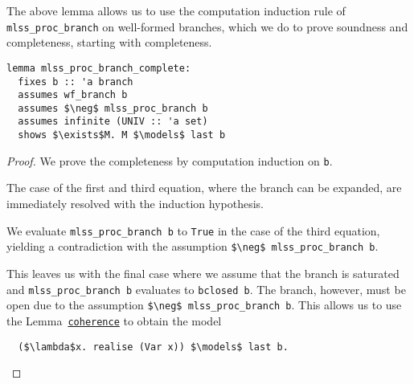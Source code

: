 \documentclass[sigplan,10pt,anonymous,review]{acmart}
\begin{document}
\noindent The above lemma allows us to use the computation induction rule of \lstinline!mlss_proc_branch! on well-formed branches, which we do to prove soundness and completeness, starting with completeness.
\begin{lstlisting}[belowskip=0pt]
lemma mlss_proc_branch_complete:
  fixes b :: 'a branch
  assumes wf_branch b
  assumes $\neg$ mlss_proc_branch b
  assumes infinite (UNIV :: 'a set)
  shows $\exists$M. M $\models$ last b
\end{lstlisting}
\begin{proof}
  We prove the completeness by computation induction on \lstinline!b!.

  The case of the first and third equation, where the branch can be expanded, are immediately resolved with the induction hypothesis.

  We evaluate \lstinline!mlss_proc_branch b! to \lstinline!True! in the case of the third equation, yielding a contradiction with the assumption \lstinline!$\neg$ mlss_proc_branch b!.

  This leaves us with the final case where we assume that the branch is saturated and \lstinline!mlss_proc_branch b! evaluates to \lstinline!bclosed b!.
  The branch, however, must be open due to the assumption \lstinline!$\neg$ mlss_proc_branch b!.
  This allows us to use the Lemma~\hyperref[lst:coherence]{\lstinline!coherence!} to obtain the model
\begin{lstlisting}
  ($\lambda$x. realise (Var x)) $\models$ last b.
\end{lstlisting}
\end{proof}
\end{document}
